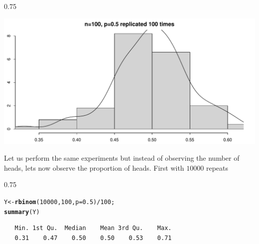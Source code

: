 \documentclass{beamer}\usepackage[]{graphicx}\usepackage[]{color}
\makeatletter
\newcommand{\hlnum}[1]{\textcolor[rgb]{0.2,0.2,0.2}{#1}}%
\newcommand{\hlopt}[1]{\textcolor[rgb]{0.102,0.102,0.102}{#1}}%
\newcommand{\hlstd}[1]{\textcolor[rgb]{0.102,0.102,0.102}{#1}}%
\newcommand{\hlkwb}[1]{\textcolor[rgb]{0.102,0.102,0.102}{#1}}%
\newcommand{\hlkwc}[1]{\textcolor[rgb]{0.2,0.2,0.2}{#1}}%
\newcommand{\hlkwd}[1]{\textcolor[rgb]{0.102,0.102,0.102}{\textbf{#1}}}%
\newenvironment{kframe}{%
 \def\at@end@of@kframe{}%
 \ifinner\ifhmode%
  \def\at@end@of@kframe{\end{minipage}}%
  \begin{minipage}{\columnwidth}%
 \fi\fi%
 \def\FrameCommand##1{\hskip\@totalleftmargin \hskip-\fboxsep
 \colorbox{shadecolor}{##1}\hskip-\fboxsep
     \hskip-\linewidth \hskip-\@totalleftmargin \hskip\columnwidth}%
 \MakeFramed {\advance\hsize-\width
   \@totalleftmargin\z@ \linewidth\hsize
   \@setminipage}}%
 {\par\unskip\endMakeFramed%
 \at@end@of@kframe}
\newenvironment{knitrout}{}{} %
\renewenvironment{knitrout}{\begin{spacing}{0.75}\begin{tiny}}{\end{tiny}\end{spacing}}
\makeatother
\begin{document}
\begin{frame}[fragile]

\begin{knitrout}\small
{}\color{fgcolor}

{\centering \includegraphics[width=0.89\linewidth]{figure/graphics-unnamed-chunk-11-1} 

}



\end{knitrout}

\end{frame}


\begin{frame}[fragile]

Let us perform the same experiments but instead of observing the number of heads, lets now observe the proportion of heads. First with $10000$ repeats

\begin{knitrout}\small
{}\color{fgcolor}\begin{kframe}
\begin{alltt}
\hlstd{Y} \hlkwb{<-} \hlkwd{rbinom}\hlstd{(}\hlnum{10000}\hlstd{,} \hlnum{100}\hlstd{,} \hlkwc{p}\hlstd{=}\hlnum{0.5}\hlstd{)}\hlopt{/} \hlnum{100}\hlstd{;}
\hlkwd{summary}\hlstd{(Y)}
\end{alltt}
\begin{verbatim}
   Min. 1st Qu.  Median    Mean 3rd Qu.    Max. 
   0.31    0.47    0.50    0.50    0.53    0.71 
\end{verbatim}
\end{kframe}
\end{knitrout}

\end{frame}
\end{document}
